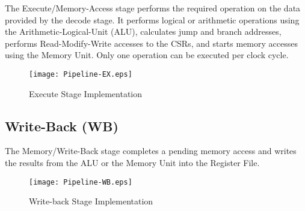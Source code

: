 The Execute/Memory-Access stage performs the required operation on the
data provided by the decode stage. It performs logical or arithmetic
operations using the Arithmetic-Logical-Unit (ALU), calculates jump and
branch addresses, performs Read-Modify-Write accesses to the CSRs, and
starts memory accesses using the Memory Unit. Only one operation can be
executed per clock cycle.

\begin{figure}[h]
  \texttt{[image: Pipeline-EX.eps]}
  \caption{Execute Stage Implementation}
\end{figure}

\pagebreak

\subsection{Write-Back (WB)}\label{write-back-wb-1}

The Memory/Write-Back stage completes a pending memory access and writes
the results from the ALU or the Memory Unit into the Register File.

\begin{figure}[h]
  \texttt{[image: Pipeline-WB.eps]}
  \caption{Write-back Stage Implementation}
\end{figure}